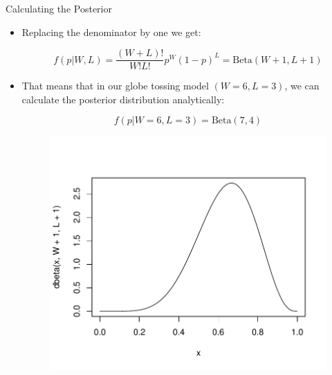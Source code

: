 \documentclass[handout]{beamer}
\begin{document}
\begin{frame}{Calculating the Posterior}
\scriptsize{

\begin{itemize}

\item Replacing the denominator by one we get:

\begin{displaymath}
f(p|W,L) =  \frac{(W+L)!}{W!L!}p^W(1-p)^L = \text{Beta}(W+1 , L+1) 
\end{displaymath}


\item That means that in our globe tossing model $(W=6,L=3)$, we can calculate the posterior distribution analytically: 

\begin{displaymath}
f(p|W=6,L=3) =  \text{Beta}(7,4) 
\end{displaymath}


\begin{figure}[h!]
	\centering
	\includegraphics[scale=0.5]{pics/beta(7,4).pdf}
\end{figure}



\end{itemize}

} 

\end{frame}
\end{document}
